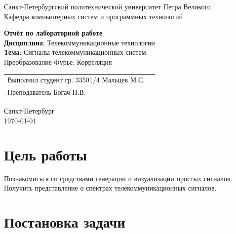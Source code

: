 \documentclass[a4paper,14pt]{extarticle}
\begin{document}
\begin{titlepage}
\centering
Санкт-Петербургский политехнический университет Петра Великого \\
\vspace{0.15cm}
Кафедра компьютерных систем и программных технологий \\
\vspace{6.5cm}

{\centering \textbf{Отчёт по лабораторной работе} \\ 
\vspace{0.15cm}
\textbf{Дисциплина}: Телекоммуникационные технологии \\
\vspace{0.15cm}
\textbf{Тема}: Сигналы телекоммуникационных
систем.\\ Преобразование
Фурье. Корреляция} \\


\vspace{6.5cm}

\begin{table}[H]
\begin{tabular}{p{\textwidth}@{}r}
{Выполнил студент гр. 33501/4} \hfill {Мальцев  М.С.} \\
{Преподаватель} \hfill {Богач Н.В.} \\
\end{tabular}
\end{table}
\vfill

{\centering Санкт-Петербург \\ 
\vspace{0.15cm}
\today}
\end{titlepage}

\tableofcontents
\newpage

\section{Цель работы}

Познакомиться со средствами генерации и визуализации простых 
сигналов. Получить представление о спектрах телекоммуникационных
сигналов.

\section{Постановка задачи}
\end{document}
